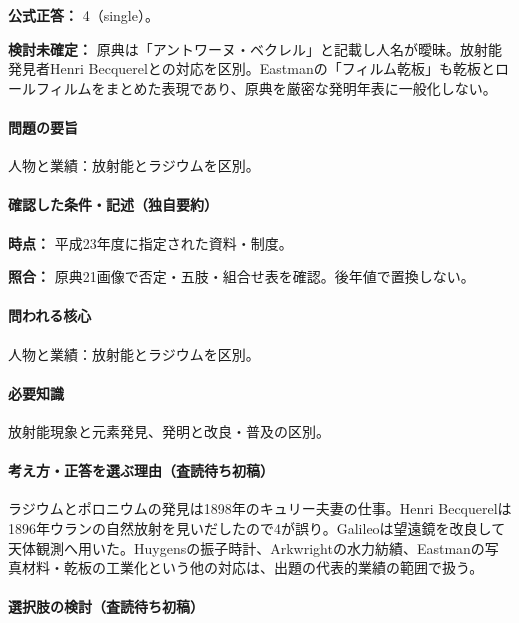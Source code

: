 \textbf{公式正答：} 4（single）。

\par\textbf{検討未確定：} 原典は「アントワーヌ・ベクレル」と記載し人名が曖昧。放射能発見者Henri Becquerelとの対応を区別。Eastmanの「フィルム乾板」も乾板とロールフィルムをまとめた表現であり、原典を厳密な発明年表に一般化しない。

\paragraph{問題の要旨} 人物と業績：放射能とラジウムを区別。

\paragraph{確認した条件・記述（独自要約）}\mbox{}\par

\noindent\textbf{時点：} 平成23年度に指定された資料・制度。\par

\noindent\textbf{照合：} 原典21画像で否定・五肢・組合せ表を確認。後年値で置換しない。\par

\paragraph{問われる核心} 人物と業績：放射能とラジウムを区別。

\paragraph{必要知識} 放射能現象と元素発見、発明と改良・普及の区別。

\paragraph{考え方・正答を選ぶ理由（査読待ち初稿）} ラジウムとポロニウムの発見は1898年のキュリー夫妻の仕事。Henri Becquerelは1896年ウランの自然放射を見いだしたので4が誤り。Galileoは望遠鏡を改良して天体観測へ用いた。Huygensの振子時計、Arkwrightの水力紡績、Eastmanの写真材料・乾板の工業化という他の対応は、出題の代表的業績の範囲で扱う。

\paragraph{選択肢の検討（査読待ち初稿）}\mbox{}\par

